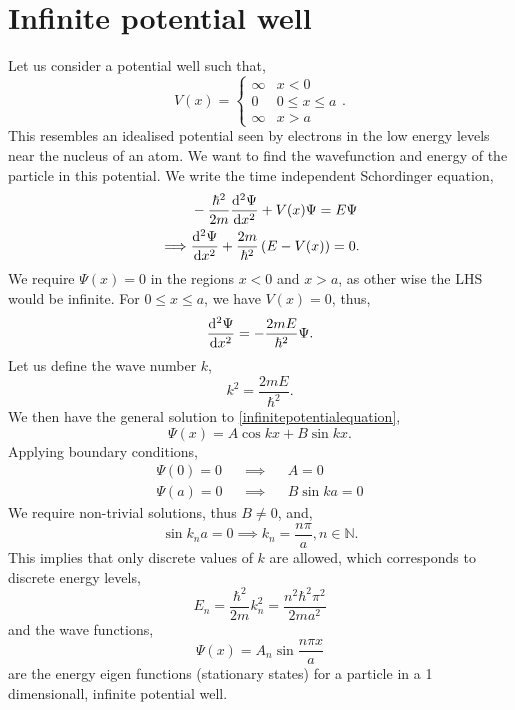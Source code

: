 \documentclass{book}
\begin{document}
\section{Infinite potential well}
Let us consider a potential well such that,
\begin{equation}
	V(x) = \begin{cases}
		\infty & x < 0 \\
		0 & 0 \leq x \leq a \\
		\infty & x > a
	\end{cases}.
\end{equation}
This resembles an idealised potential seen by electrons in the low energy levels near the nucleus of an atom. We want to find the wavefunction and energy of the particle in this potential. We write the time independent Schordinger equation,
\begin{equation}
	\begin{split}
	& -\frac{\hbar^2}{2m}\dv[2]{\Psi}{x} + V(x)\Psi = E\Psi\\
	\implies & \dv[2]{\Psi}{x} + \frac{2m}{\hbar^2} \left(E-V(x)\right) = 0.
	\end{split}
\end{equation}
We require $\Psi(x) = 0$ in the regions $x < 0$ and $x > a$, as other wise the LHS would be infinite. For $0 \leq x \leq a$, we have $V(x) =0$, thus,
\begin{equation}
	\dv[2]{\Psi}{x} = - \frac{2mE}{\hbar^2}\Psi \label{infinitepotentialequation}.
\end{equation}
Let us define the wave number $k$, 
\begin{equation}
	k^2 = \frac{2mE}{\hbar^2}.
\end{equation}
We then have the general solution to \eqref{infinitepotentialequation},
\begin{equation}
	\Psi(x) = A\cos kx + B \sin kx.
\end{equation}
Applying boundary conditions,
\begin{align}
	\Psi(0) = 0 && \implies && A = 0 \\
	\Psi(a) = 0 && \implies && B\sin ka = 0
\end{align}
We require non-trivial solutions, thus $B \neq 0$, and,
\begin{equation}
	\sin k_n a = 0 \implies k_n = \frac{n\pi}{a}, n \in \mathbb{N}.
\end{equation}
This implies that only discrete values of $k$ are allowed, which corresponds to discrete energy levels,
\begin{equation}
	E_n = \frac{\hbar^2}{2m}k_n^2 = \frac{n^2\hbar^2\pi^2}{2ma^2}
\end{equation}
and the wave functions,
\begin{equation}
	\Psi(x) = A_n \sin\frac{n\pi x}{a}
\end{equation}
are the energy eigen functions (stationary states) for a particle in a 1 dimensionall, infinite potential well.
\end{document}
